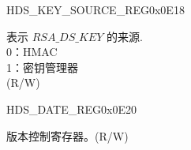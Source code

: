 \begin{register}{H}{DS\_KEY\_SOURCE\_REG}{0x0E18}\label{regdesc:DSKEYSOURCEREG}
%
%
\regnewline%
\begin{regdesc}\begin{reglist}
\label{fielddesc:DSKEYSOURCE}\item [DS\_KEY\_SOURCE] 表示 \begin{math}RSA\_DS\_KEY\end{math} 的来源. \\
0：HMAC\\
1：密钥管理器\\
(R/W)
\end{reglist}\end{regdesc}
\end{register}


\begin{register}{H}{DS\_DATE\_REG}{0x0E20}\label{regdesc:DSDATEREG}
%
%
\regnewline%
\begin{regdesc}\begin{reglist}
\label{fielddesc:DSDATE}\item [DS\_DATE] 版本控制寄存器。(R/W)
\end{reglist}\end{regdesc}
\end{register}
